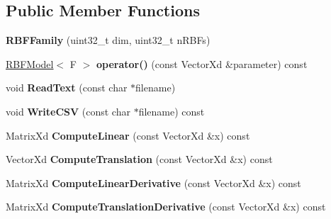 \subsection*{Public Member Functions}
\begin{DoxyCompactItemize}
\item 
\hypertarget{struct_d_r_d_s_p_1_1_r_b_f_family_a9c475b94072daf500d528cdea63b7edc}{{\bfseries R\-B\-F\-Family} (uint32\-\_\-t dim, uint32\-\_\-t n\-R\-B\-Fs)}\label{struct_d_r_d_s_p_1_1_r_b_f_family_a9c475b94072daf500d528cdea63b7edc}

\item 
\hypertarget{struct_d_r_d_s_p_1_1_r_b_f_family_a910e425f87aec3f906d8ea69e1184317}{\hyperlink{struct_d_r_d_s_p_1_1_r_b_f_model}{R\-B\-F\-Model}$<$ F $>$ {\bfseries operator()} (const Vector\-Xd \&parameter) const }\label{struct_d_r_d_s_p_1_1_r_b_f_family_a910e425f87aec3f906d8ea69e1184317}

\item 
\hypertarget{struct_d_r_d_s_p_1_1_r_b_f_family_aac8af8a4b41acb5c51d43ec9500df5c7}{void {\bfseries Read\-Text} (const char $\ast$filename)}\label{struct_d_r_d_s_p_1_1_r_b_f_family_aac8af8a4b41acb5c51d43ec9500df5c7}

\item 
\hypertarget{struct_d_r_d_s_p_1_1_r_b_f_family_a736037a90475af4e332675be367e14c8}{void {\bfseries Write\-C\-S\-V} (const char $\ast$filename) const }\label{struct_d_r_d_s_p_1_1_r_b_f_family_a736037a90475af4e332675be367e14c8}

\item 
\hypertarget{struct_d_r_d_s_p_1_1_r_b_f_family_ab7c54eceb251a38bc897a86afc5750c1}{Matrix\-Xd {\bfseries Compute\-Linear} (const Vector\-Xd \&x) const }\label{struct_d_r_d_s_p_1_1_r_b_f_family_ab7c54eceb251a38bc897a86afc5750c1}

\item 
\hypertarget{struct_d_r_d_s_p_1_1_r_b_f_family_ad6c7bdd1beb89e32d16d20be9fed9150}{Vector\-Xd {\bfseries Compute\-Translation} (const Vector\-Xd \&x) const }\label{struct_d_r_d_s_p_1_1_r_b_f_family_ad6c7bdd1beb89e32d16d20be9fed9150}

\item 
\hypertarget{struct_d_r_d_s_p_1_1_r_b_f_family_abe05121282197b8a2a7a171557040b3f}{Matrix\-Xd {\bfseries Compute\-Linear\-Derivative} (const Vector\-Xd \&x) const }\label{struct_d_r_d_s_p_1_1_r_b_f_family_abe05121282197b8a2a7a171557040b3f}

\item 
\hypertarget{struct_d_r_d_s_p_1_1_r_b_f_family_ad47cf5e7338ead2f313983c967f31739}{Matrix\-Xd {\bfseries Compute\-Translation\-Derivative} (const Vector\-Xd \&x) const }\label{struct_d_r_d_s_p_1_1_r_b_f_family_ad47cf5e7338ead2f313983c967f31739}

\end{DoxyCompactItemize}
